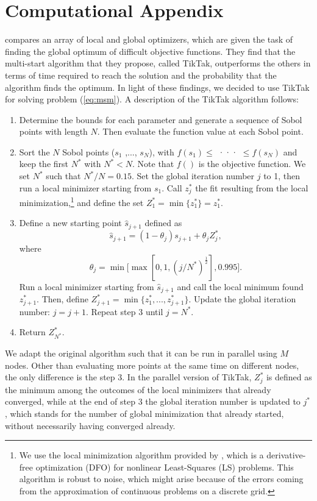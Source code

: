 \documentclass[12pt]{article}
\numberwithin{table}{section}
\begin{document}
\section{Computational Appendix}\label{section:computation}
\cite{arnoud2019} compares an array of local and global optimizers, which are given the task of finding the global optimum of difficult objective functions. They find that the multi-start algorithm that they propose, called TikTak, outperforms the others in terms of time required to reach the solution and the probability that the algorithm finds the optimum. In light of these findings, we decided to use TikTak for solving problem (\ref{eq:msm}). A description of the TikTak algorithm follows:
\begin{enumerate}
\item Determine the bounds for each parameter and generate a sequence of Sobol points with length $N$. Then evaluate the function value at each Sobol point.
\item Sort the $N$ Sobol points ($s_1$ ,..., $s_N$), with $f(s_1)\le$ ··· $\le f(s_N)$ and keep the first $N^*$ with $N^*<N$. Note that $f()$ is the objective function. We set $N^*$ such that $N^*/N=0.15.$ Set the global iteration number $j$ to 1, then run a local minimizer starting from $s_1$. Call $z^*_j$ the fit resulting from the local minimization,\footnote{We use the local minimization algorithm provided by \cite{cartis2019}, which is a derivative-free optimization (DFO) for nonlinear Least-Squares (LS) problems. This algorithm is robust to noise, which might arise because of the errors coming from the approximation of continuous problems on a discrete grid.} and define the set $Z^*_1=\min \{z^*_1\}=z^*_1 $.
\item Define a new starting point $\hat{s}_{j+1}$ defined as
$$\hat{s}_{j+1}=(1-\theta_j)s_{j+1}+\theta_j Z^*_j, $$
where
$$\theta_j=\min \big[\max[0,1,(j/N^*)^\frac{1}{2}],0.995\big]. $$
Run a local minimizer starting from $\hat{s}_{j+1}$ and call the local minimum found $z^*_{j+1}$. Then, define $Z^*_{j+1}=\min \{z^*_1,...,z^*_{j+1} \} $. Update the global iteration number: $j=j+1$. Repeat step 3 until $j=N^*$.

\item  Return $Z^*_{N^*}$.
\end{enumerate}
We adapt the original algorithm such that it can be run in parallel using $M$ nodes. Other than evaluating more points at the same time on different nodes, the only difference is the step 3. In the parallel version of TikTak, $Z^*_{j}$ is defined as the minimum among the outcomes  of the local minimizers  that already converged, while at the end of step 3 the global iteration number is updated to $j^*$, which stands for the number of global minimization that already started, without necessarily having converged already.
\end{document}
